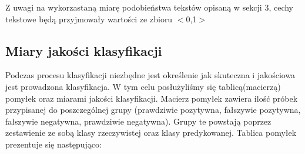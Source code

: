 \documentclass{classrep}
\begin{document}
\indent Z uwagi na wykorzastaną miarę podobieństwa tekstów opisaną w sekcji 3, cechy tekstowe będą przyjmowały wartości ze zbioru $<$0,1$>$

\subsection{Miary jakości klasyfikacji} 
Podczas procesu klasyfikacji niezbędne jest określenie jak skuteczna i jakościowa jest prowadzona klasyfikacja. W tym celu posłużyliśmy się tablicą(macierzą) pomyłek oraz miarami jakości klasyfikacji.\cite{tablica_pomylek} Macierz pomyłek zawiera ilość próbek przypisanej do poszczególnej grupy (prawdziwie pozytywna, fałszywie pozytywna, fałszywie negatywna, prawdziwie negatywna). Grupy te powstają poprzez zestawienie ze sobą klasy rzeczywistej oraz klasy predykowanej. Tablica pomyłek prezentuje się następująco: \\
\end{document}
